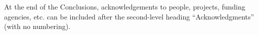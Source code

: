 \documentclass{article}
\begin{document}
%
%


\begin{acknowledgments}
At the end of the Conclusions, acknowledgements to people, projects, funding agencies, etc. can be included after the second-level heading  ``Acknowledgments'' (with no numbering).
\end{acknowledgments} 


\end{document}
